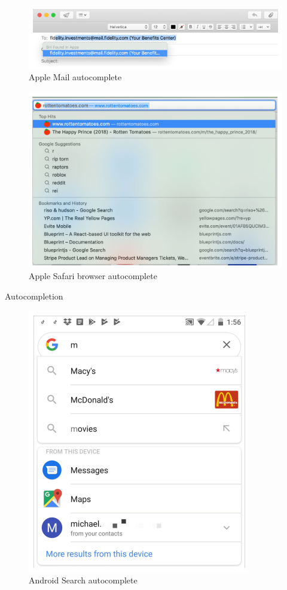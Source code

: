 \documentclass{beamer}
\begin{document}
\begin{frame}[t]
	\begin{figure}[h]
		\centering
		\includegraphics[scale=0.4]{images/lec08-pic51.png}
		\caption{Apple Mail autocomplete}
	\end{figure}

	\begin{figure}[h]
		\centering
		\includegraphics[scale=0.4]{images/lec08-pic52.png}
		\caption{Apple Safari browser autocomplete}
	\end{figure}
\end{frame}

\begin{frame}[t]{Autocompletion}
	\begin{figure}[h]
		\centering
		\includegraphics[scale=0.5]{images/lec08-pic53.png}
		\caption{Android Search autocomplete}
	\end{figure}
\end{frame}
\end{document}
